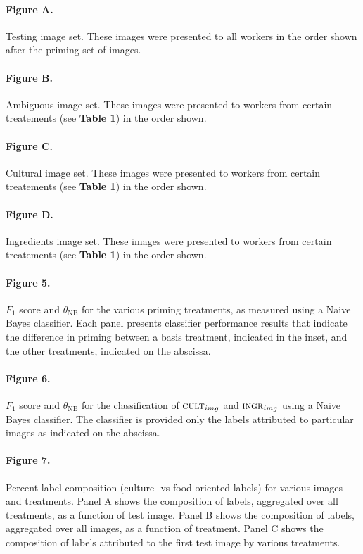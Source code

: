 \documentclass[a4paper]{report}
\begin{document}
\paragraph{Figure A.}
	Testing image set. These images were presented to all workers in the order 
	shown after the priming set of images. 

\paragraph{Figure B.}
	Ambiguous image set. These images were presented to workers from certain
	treatements (see \textbf{Table 1}) in the order shown.  

\paragraph{Figure C.}
	Cultural image set. These images were presented to workers from certain
	treatements (see \textbf{Table 1}) in the order shown.  

\paragraph{Figure D.}
	Ingredients image set. These images were presented to workers from certain
	treatements (see \textbf{Table 1}) in the order shown.  

\paragraph{Figure 5.}
$F_1$ score and $\theta_\text{NB}$ for the various 
priming treatments, as measured using a Naive Bayes classifier. Each panel 
presents classifier performance results that indicate the difference in
priming between a basis 
treatment, indicated in the inset, and the other treatments, indicated on the
abscissa.

\paragraph{Figure 6.}
$F_1$ score and $\theta_\text{NB}$ for the classification of 
$\textsc{cult}_{img}$ and $\textsc{ingr}_{img}$ using a Naive Bayes 
classifier.  The classifier is provided only the labels attributed to
particular images as indicated on the abscissa.

\paragraph{Figure 7.}
Percent label composition (culture- vs food-oriented labels) for 
various images and treatments.  Panel A shows the composition of 
labels, aggregated over all treatments, as a function of test image.
Panel B shows the composition of labels, aggregated over all images, as
a function of treatment.  Panel C shows the composition of labels 
attributed to the first test image by various treatments.
\end{document}

